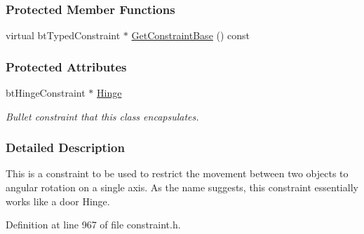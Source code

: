 \subsubsection*{Protected Member Functions}
\begin{DoxyCompactItemize}
\item 
virtual btTypedConstraint $\ast$ \hyperlink{classphys_1_1HingeConstraint_afd52bcc691313cc175d0a409d5594df2}{GetConstraintBase} () const 
\end{DoxyCompactItemize}
\subsubsection*{Protected Attributes}
\begin{DoxyCompactItemize}
\item 
\hypertarget{classphys_1_1HingeConstraint_afa4e4f1595d6420f21449d5e3b730f49}{
btHingeConstraint $\ast$ \hyperlink{classphys_1_1HingeConstraint_afa4e4f1595d6420f21449d5e3b730f49}{Hinge}}
\label{classphys_1_1HingeConstraint_afa4e4f1595d6420f21449d5e3b730f49}

\begin{DoxyCompactList}\small\item\em Bullet constraint that this class encapsulates. \item\end{DoxyCompactList}\end{DoxyCompactItemize}


\subsubsection{Detailed Description}
This is a constraint to be used to restrict the movement between two objects to angular rotation on a single axis. As the name suggests, this constraint essentially works like a door Hinge. 

Definition at line 967 of file constraint.h.



